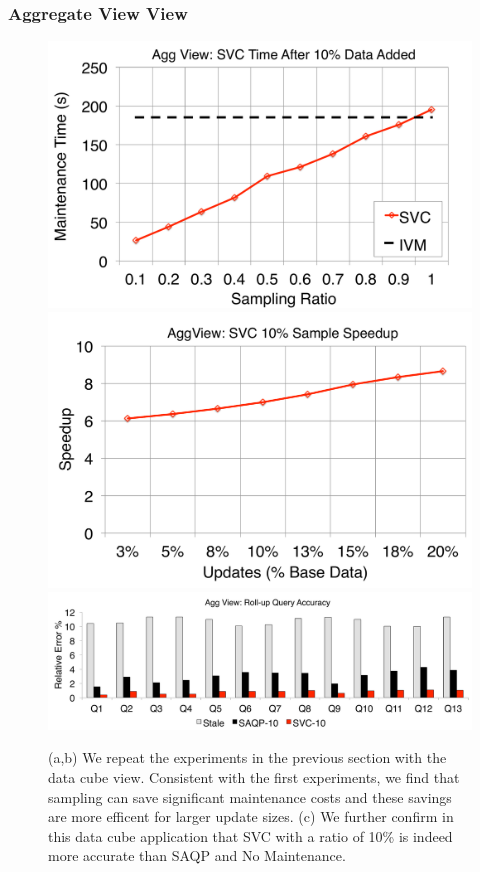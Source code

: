 \subsubsection{Aggregate View View}
\label{exp-datacube}

\begin{figure}[t]
\centering
 \includegraphics[scale=0.20]{exp/msdc_1.pdf}
 \includegraphics[scale=0.20]{exp/msdc_2.pdf}
  \includegraphics[scale=0.17]{exp/msdc_3.pdf}
   \caption{(a,b) We repeat the experiments in the previous section with the data cube view. Consistent with the first experiments, we find that sampling can save significant maintenance costs and these savings are more efficent for larger update sizes. (c) We further confirm in this data cube application that SVC with a ratio of 10\% is indeed more accurate than SAQP and No Maintenance.\label{exp2-acc-sample}}
\end{figure}

